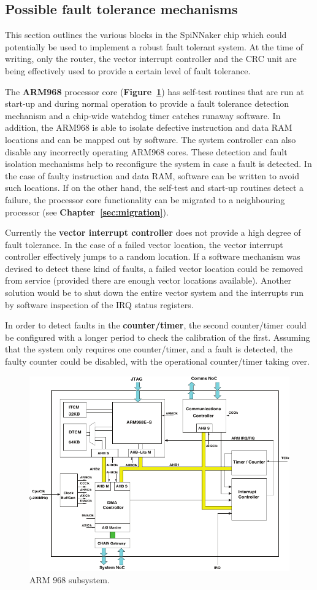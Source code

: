 \documentclass[oneside, a4paper, 11pt]{memoir}
\begin{document}
\subsection{Possible fault tolerance mechanisms}
This section outlines the various blocks in the SpiNNaker chip which could potentially be used to implement a robust fault tolerant system. At the time of writing, only the router, the vector interrupt controller and the CRC unit are being effectively used to provide a certain level of fault tolerance.

The \textbf{ARM968} processor core (\textbf{Figure~\ref{fig:arm968}}) has self-test routines that are run at start-up and during normal operation to provide a fault tolerance detection mechanism and a chip-wide watchdog timer catches runaway software. In addition, the ARM968 is able to isolate defective instruction and data RAM locations and can be mapped out by software. The system controller can also disable any incorrectly operating ARM968 cores. These detection and fault isolation mechanisms help to reconfigure the system in case a fault is detected. In the case of faulty instruction and data RAM, software can be written to avoid such locations. If on the other hand, the self-test and start-up routines detect a failure, the processor core functionality can be migrated to a neighbouring processor (see \textbf{Chapter~\ref{sec:migration}}).

Currently the \textbf{vector interrupt controller} does not provide a high degree of fault tolerance. In the case of a failed vector location, the vector interrupt controller effectively jumps to a random location. If a software mechanism was devised to detect these kind of faults, a failed vector location could be removed from service (provided there are enough vector locations available). Another solution would be to shut down the entire vector system and the interrupts run by software inspection of the IRQ status registers.

In order to detect faults in the \textbf{counter/timer}, the second counter/timer could be configured with a longer period to check the calibration of the first. Assuming that the system only requires one counter/timer, and a fault is detected, the faulty counter could be disabled, with the operational counter/timer taking over.

\begin{figure}[t]
	\centering
	\includegraphics[width=0.7\linewidth]{images/arm968_subsystem.pdf}
	\caption{ARM 968 subsystem.}
	\label{fig:arm968}
\end{figure}
\end{document}
